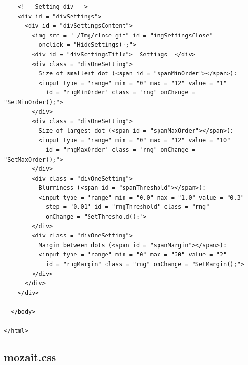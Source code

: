 \documentclass[12pt, a4paper]{article}
\begin{document}
\begin{scriptsize}
\begin{ttfamily}
\begin{lstlisting}
    <!-- Setting div -->
    <div id = "divSettings">
      <div id = "divSettingsContent">
        <img src = "./Img/close.gif" id = "imgSettingsClose"
          onclick = "HideSettings();">
        <div id = "divSettingsTitle">- Settings -</div>
        <div class = "divOneSetting">
          Size of smallest dot (<span id = "spanMinOrder"></span>): 
          <input type = "range" min = "0" max = "12" value = "1"
            id = "rngMinOrder" class = "rng" onChange = "SetMinOrder();">
        </div>
        <div class = "divOneSetting">
          Size of largest dot (<span id = "spanMaxOrder"></span>): 
          <input type = "range" min = "0" max = "12" value = "10"
            id = "rngMaxOrder" class = "rng" onChange = "SetMaxOrder();">
        </div>
        <div class = "divOneSetting">
          Blurriness (<span id = "spanThreshold"></span>): 
          <input type = "range" min = "0.0" max = "1.0" value = "0.3"
            step = "0.01" id = "rngThreshold" class = "rng"  
            onChange = "SetThreshold();">
        </div>
        <div class = "divOneSetting">
          Margin between dots (<span id = "spanMargin"></span>): 
          <input type = "range" min = "0" max = "20" value = "2"
            id = "rngMargin" class = "rng" onChange = "SetMargin();">
        </div>
      </div>
    </div>
      
  </body>

</html>
\end{lstlisting}
\end{ttfamily}
\end{scriptsize}

\subsection{mozait.css}
\end{document}
